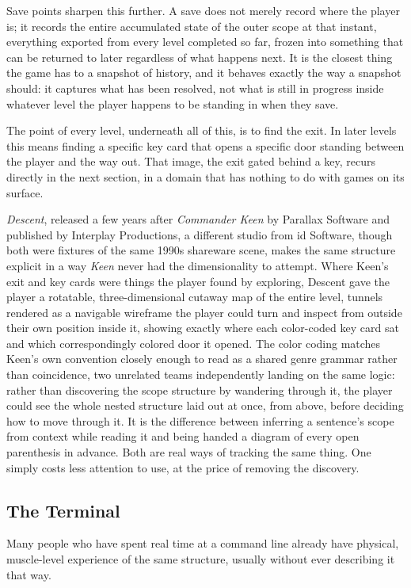 \documentclass[11pt]{article}
\begin{document}
Save points sharpen this further. A save does not merely record where the player is; it records the entire accumulated state of the outer scope at that instant, everything exported from every level completed so far, frozen into something that can be returned to later regardless of what happens next. It is the closest thing the game has to a snapshot of history, and it behaves exactly the way a snapshot should: it captures what has been resolved, not what is still in progress inside whatever level the player happens to be standing in when they save.

The point of every level, underneath all of this, is to find the exit. In later levels this means finding a specific key card that opens a specific door standing between the player and the way out. That image, the exit gated behind a key, recurs directly in the next section, in a domain that has nothing to do with games on its surface.

\emph{Descent}, released a few years after \emph{Commander Keen} by Parallax Software and published by Interplay Productions, a different studio from id Software, though both were fixtures of the same 1990s shareware scene, makes the same structure explicit in a way \emph{Keen} never had the dimensionality to attempt. Where Keen's exit and key cards were things the player found by exploring, Descent gave the player a rotatable, three-dimensional cutaway map of the entire level, tunnels rendered as a navigable wireframe the player could turn and inspect from outside their own position inside it, showing exactly where each color-coded key card sat and which correspondingly colored door it opened. The color coding matches Keen's own convention closely enough to read as a shared genre grammar rather than coincidence, two unrelated teams independently landing on the same logic: rather than discovering the scope structure by wandering through it, the player could see the whole nested structure laid out at once, from above, before deciding how to move through it. It is the difference between inferring a sentence's scope from context while reading it and being handed a diagram of every open parenthesis in advance. Both are real ways of tracking the same thing. One simply costs less attention to use, at the price of removing the discovery.

\subsection{The Terminal}

Many people who have spent real time at a command line already have physical, muscle-level experience of the same structure, usually without ever describing it that way.
\end{document}
